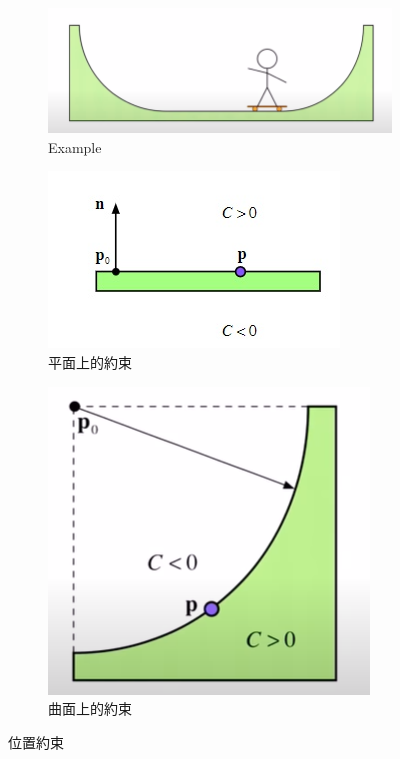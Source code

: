\begin{figure}[h]
    \begin{subfigure}[b]{0.3\linewidth}
    \includegraphics[width=\linewidth]{./resources/physics/position.png}
    \caption{Example}
    \end{subfigure}
    \begin{subfigure}[b]{0.3\linewidth}
    \includegraphics[width=\linewidth]{./resources/physics/plat.png}
    \caption{平面上的約束}
    \end{subfigure}
    \begin{subfigure}[b]{0.3\linewidth}
    \includegraphics[width=\linewidth]{./resources/physics/curve.png}
    \caption{曲面上的約束}
    \end{subfigure}
\caption{位置約束}
\label{fig:Postion_constraint}
\end{figure}


